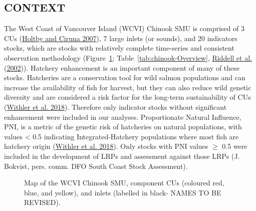 \documentclass[11pt]{book}
\begin{document}
\hypertarget{context-1}{%
\subsection{CONTEXT}\label{context-1}}

The West Coast of Vancouver Island (WCVI) Chinook SMU is comprised of 3 CUs (\protect\hyperlink{ref-holtbyConservationUnitsPacific2007}{Holtby and Ciruna 2007}), 7 large inlets (or sounds), and 20 indicators stocks, which are stocks with relatively complete time-series and consistent observation methodology (Figure~\ref{fig:chinook-map}; Table~\ref{tab:chinook-Overview}, \protect\hyperlink{ref-riddellReview2001Chinook2002}{Riddell et al.} (\protect\hyperlink{ref-riddellReview2001Chinook2002}{2002})). Hatchery enhancement is an important component of many of these stocks. Hatcheries are a conservation tool for wild salmon populations and can increase the availability of fish for harvest, but they can also reduce wild genetic diversity and are considered a risk factor for the long-term sustainability of CUs (\protect\hyperlink{ref-withlerGeneticallyBasedTargets2018}{Withler et al. 2018}). Therefore only indicator stocks without significant enhancement were included in our analyses. Proportionate Natural Influence, PNI, is a metric of the genetic risk of hatcheries on natural populations, with values \textless{} 0.5 indicating Integrated-Hatchery populations where most fish are hatchery origin (\protect\hyperlink{ref-withlerGeneticallyBasedTargets2018}{Withler et al. 2018}). Only stocks with PNI values \(\geqslant\) 0.5 were included in the development of LRPs and assessment against those LRPs (J. Bokvist, pers. comm. DFO South Coast Stock Assessment).
\begin{figure}[htb]

{\centering {} 

}

\caption{Map of the WCVI Chinook SMU, component CUs (coloured red, blue, and yellow), and inlets (labelled in black- NAMES TO BE REVISED).}\label{fig:chinook-map}
\end{figure}
\end{document}
